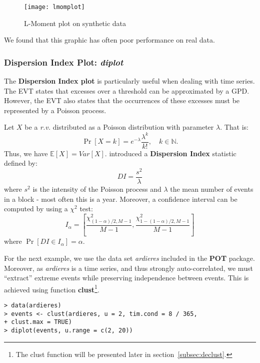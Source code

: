 \documentclass[11pt,a4paper]{article}
\numberwithin{equation}{section}
\begin{document}
\begin{figure}
  \centering
  \texttt{[image: lmomplot]}
  \caption{L-Moment plot on synthetic data}
  \label{fig:lmomplot}
\end{figure}

We found that this graphic has often poor performance on real data.

\subsubsection{Dispersion Index Plot: \emph{diplot}}

The \textbf{Dispersion Index plot} is particularly useful when dealing
with time series. The EVT states that excesses over a threshold can be
approximated by a GPD. However, the EVT also states that the
occurrences of these excesses must be represented by a Poisson
process.

Let $X$ be a \textit{r.v.} distributed as a Poisson distribution with
parameter $\lambda$. That is:
\begin{equation}
  \label{eq:poissLaw}
  \Pr\left[X = k\right] = e^{-\lambda} \frac{\lambda^k}{k!}, \quad k
  \in \mathbb{N}.
\end{equation}
Thus, we have $\mathbb{E}\left[X\right] =
Var\left[X\right]$. \citet{Cunnane1979} introduced a
\textbf{Dispersion Index} statistic defined by:
\begin{equation}
  \label{eq:DI}
  DI = \frac{s^2}{\lambda}
\end{equation}
where $s^2$ is the intensity of the Poisson process and $\lambda$ the
mean number of events in a block - most often this is a
year. Moreover, a confidence interval can be computed by using a
$\chi^2$ test:
\begin{equation}
  \label{eq:confDI}
   I_{\alpha} = \left[ \frac{\chi^2_{\left(1 - \alpha\right) / 2,
        M-1}}{M-1}, \frac{\chi^2_{1 - \left( 1 -\alpha\right) / 2,
        M-1}}{M-1} \right]
\end{equation}
where $\Pr\left[ DI \in I_{\alpha} \right] = \alpha$.

For the next example, we use the data set \emph{ardieres} included in
the \textbf{POT} package. Moreover, as \emph{ardieres} is a time
series, and thus strongly auto-correlated, we must ``extract'' extreme
events while preserving independence between events. This is achieved
using function \textbf{clust}\footnote{The clust function will be
  presented later in section~\ref{subsec:declust}.}.
\begin{verbatim}
> data(ardieres)
> events <- clust(ardieres, u = 2, tim.cond = 8 / 365,
+ clust.max = TRUE)
> diplot(events, u.range = c(2, 20))
\end{verbatim}
\end{document}
